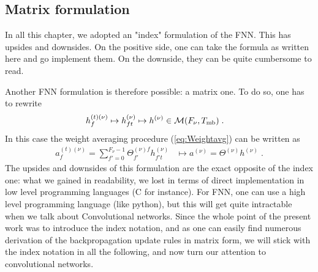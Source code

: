 \begin{subappendices}
\section{Matrix formulation}

In all this chapter, we adopted an "index" formulation of the FNN. This has upsides and downsides. On the positive side, one can take the formula as written here and go implement them. On the downside, they can be quite cumbersome to read.

\vspace{0.2cm}

Another FNN formulation is therefore possible: a matrix one. To do so, one has to rewrite
\begin{align}
h_f^{(t)(\nu)}\mapsto h^{(\nu)}_{ft}&\mapsto h^{(\nu)}\in \mathcal{M}(F_\nu,T_{\rm mb})\;.
\end{align}
In this case the weight averaging procedure (\ref{eq:Weightavg}) can be written as
\begin{align}
a_f^{(t)(\nu)}=\sum_{f'=0}^{F_\nu-1}\Theta^{(\nu)f}_{f'}h^{(\nu)}_{f't}&\mapsto a^{(\nu)}=\Theta^{(\nu)}h^{(\nu)}\;.
\end{align}
The upsides and downsides of this formulation are the exact opposite of the index one: what we gained in readability, we lost in terms of direct implementation in low level programming languages (C for instance). For FNN, one can use a high level programming language (like python), but this will get quite intractable when we talk about Convolutional networks. Since the whole point of the present work was to introduce the index notation, and as one can easily find numerous derivation of the backpropagation update rules in matrix form, we will stick with the index notation in all the following, and now turn our attention to convolutional networks.
\end{subappendices}
